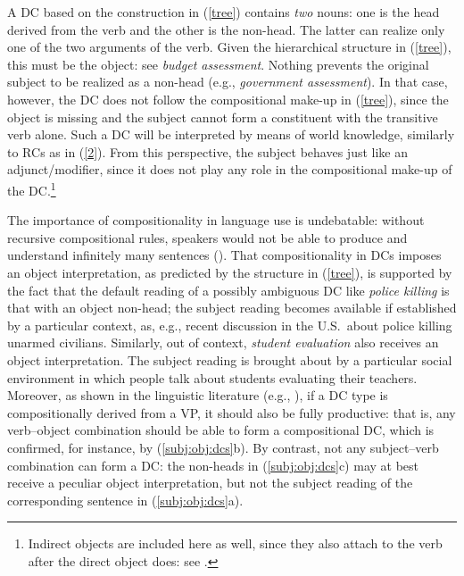 \documentclass[output=paper]{langsci/langscibook}
\begin{document}
\begin{exe}
\end{exe}

 {A DC based on the construction  in (\ref{tree}) contains \textit{two} nouns: one is the head derived from the verb and the other is the non-head. The latter can realize only one of the two arguments of the verb. Given the hierarchical structure in (\ref{tree}), this must be the object: see \textit{budget assessment}. Nothing prevents the original subject to be realized as a non-head (e.g., \textit{government assessment}). In that case, however, the DC does not follow the compositional make-up in (\ref{tree}), since the object is missing and the subject cannot form a constituent with the transitive verb alone. Such a DC will be interpreted by means of world knowledge, similarly to RCs as in (\ref{2}). From this perspective, the  subject behaves just like an adjunct/modifier, since it does not play any role in the compositional make-up of the DC.}\footnote{Indirect objects are included here as well, since they also attach to the verb after the direct object does: see \cite{larson:88}.}

 The importance of compositionality in language use is undebatable: without recursive compositional rules, speakers would not be able to produce and understand infinitely many sentences (\cite{dowty:07}). That compositionality in DCs imposes an object interpretation, as predicted by the structure in (\ref{tree}), is supported by the fact that the default reading of a possibly ambiguous DC like \textit{police killing} is that with an object non-head; the subject reading becomes available if established by a particular context, as, e.g., recent discussion in the U.S.\ about police killing unarmed civilians. Similarly, out of context, \textit{student evaluation} also receives an object interpretation. The subject reading is brought about by a particular social environment in which people talk about students evaluating their teachers. Moreover, as shown in the linguistic literature (e.g., \cite{grimshaw:90,borer:13,iordachioaia:alexiadou:pairamidis:17}), if a DC type is  compositionally derived from a VP, it should also be fully productive: that is, any verb--object combination should be able to form a compositional DC, which is confirmed, for instance, by (\ref{subj:obj:dcs}b). By contrast, not any subject--verb combination can form a DC: the non-heads in  (\ref{subj:obj:dcs}c) may at best receive a peculiar object interpretation, but not the subject reading of the corresponding sentence in (\ref{subj:obj:dcs}a).
\end{document}

